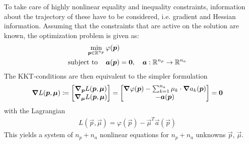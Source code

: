 		To take care of highly nonlinear equality and inequality constraints, information about the trajectory of these have to be considered, i.e. gradient and Hessian information. Assuming that the constraints that are active on the solution are known, the optimization problem is given as:
		\begin{align*}
			\min_{\bm{p} \in \mathbb{R}^{n_p}} & \, \varphi(\bm{p})                                                 \\
			\mathrm{subject~to}\quad    & \, \bm{a}(\bm{p}) = \bm{0},\quad \bm{a} : \mathbb{R}^{n_p} \to \mathbb{R}^{n_a}
		\end{align*}
		The KKT-conditions are then equivalent to the simpler formulation
		\begin{align*}
			\grad{L}(\bm{p}, \bm{\mu}) \coloneqq
			\begin{bmatrix}
				\grad_{\bm{p}}L(\bm{p}, \bm{\mu}) \\
				\grad_{\bm{\mu}}L(\bm{p}, \bm{\mu})
			\end{bmatrix}
			=
			\begin{bmatrix}
				\grad{\varphi}(\bm{p}) - \sum_{k = 1}^{n_a} \mu_k \cdot \grad{a_k}(\bm{p}) \\
				-\bm{a}(\bm{p})
			\end{bmatrix}
			= \bm{0}
		\end{align*}
		with the Lagrangian
		\begin{align*}
			L(\vec{p}, \vec{\mu}) = \varphi(\vec{p}) - \vec{\mu}^T \vec{a}(\vec{p})
		\end{align*}
		This yields a system of \( n_p + n_a \) nonlinear equations for \( n_p + n_a \) unknowns \( \vec{p} \), \( \vec{\mu} \).

